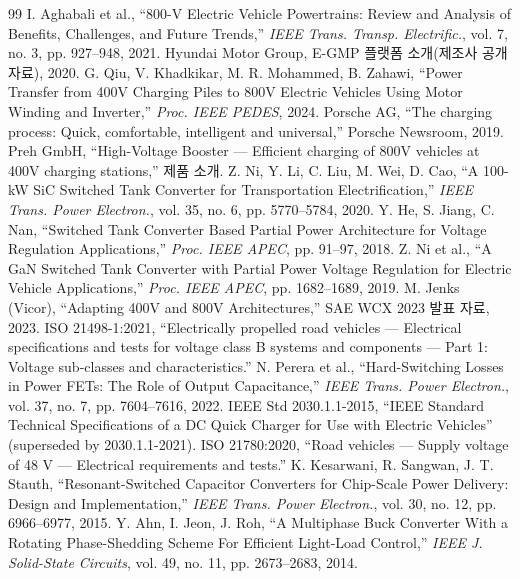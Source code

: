 \documentclass[10pt,a4paper,twocolumn]{article}
\begin{document}
\begingroup
\footnotesize
\renewcommand{\refname}{참고문헌}
\begin{thebibliography}{99}
\setlength{\itemsep}{0pt}
 I. Aghabali et al., “800-V Electric Vehicle Powertrains: Review and Analysis of Benefits, Challenges, and Future Trends,” \textit{IEEE Trans. Transp. Electrific.}, vol. 7, no. 3, pp. 927–948, 2021.
 Hyundai Motor Group, E-GMP 플랫폼 소개(제조사 공개 자료), 2020.
 G. Qiu, V. Khadkikar, M. R. Mohammed, B. Zahawi, “Power Transfer from 400V Charging Piles to 800V Electric Vehicles Using Motor Winding and Inverter,” \textit{Proc. IEEE PEDES}, 2024.
 Porsche AG, “The charging process: Quick, comfortable, intelligent and universal,” Porsche Newsroom, 2019.
 Preh GmbH, “High-Voltage Booster — Efficient charging of 800V vehicles at 400V charging stations,” 제품 소개.
 Z. Ni, Y. Li, C. Liu, M. Wei, D. Cao, “A 100-kW SiC Switched Tank Converter for Transportation Electrification,” \textit{IEEE Trans. Power Electron.}, vol. 35, no. 6, pp. 5770–5784, 2020.
 Y. He, S. Jiang, C. Nan, “Switched Tank Converter Based Partial Power Architecture for Voltage Regulation Applications,” \textit{Proc. IEEE APEC}, pp. 91–97, 2018.
 Z. Ni et al., “A GaN Switched Tank Converter with Partial Power Voltage Regulation for Electric Vehicle Applications,” \textit{Proc. IEEE APEC}, pp. 1682–1689, 2019.
 M. Jenks (Vicor), “Adapting 400V and 800V Architectures,” SAE WCX 2023 발표 자료, 2023.
 ISO 21498-1:2021, “Electrically propelled road vehicles — Electrical specifications and tests for voltage class B systems and components — Part 1: Voltage sub-classes and characteristics.”
 N. Perera et al., “Hard-Switching Losses in Power FETs: The Role of Output Capacitance,” \textit{IEEE Trans. Power Electron.}, vol. 37, no. 7, pp. 7604–7616, 2022.
 IEEE Std 2030.1.1-2015, “IEEE Standard Technical Specifications of a DC Quick Charger for Use with Electric Vehicles” (superseded by 2030.1.1-2021).
 ISO 21780:2020, “Road vehicles — Supply voltage of 48 V — Electrical requirements and tests.”
 K. Kesarwani, R. Sangwan, J. T. Stauth, “Resonant-Switched Capacitor Converters for Chip-Scale Power Delivery: Design and Implementation,” \textit{IEEE Trans. Power Electron.}, vol. 30, no. 12, pp. 6966–6977, 2015.
 Y. Ahn, I. Jeon, J. Roh, “A Multiphase Buck Converter With a Rotating Phase-Shedding Scheme For Efficient Light-Load Control,” \textit{IEEE J. Solid-State Circuits}, vol. 49, no. 11, pp. 2673–2683, 2014.

\end{thebibliography}
\end{document}
